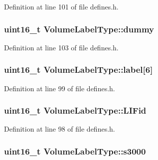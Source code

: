 Definition at line 101 of file defines.\+h.

\subsubsection[{\texorpdfstring{dummy}{dummy}}]{\setlength{\rightskip}{0pt plus 5cm}uint16\+\_\+t Volume\+Label\+Type\+::dummy}\hypertarget{structVolumeLabelType_affbd520c08374524f13708acc05f3f4e}{}\label{structVolumeLabelType_affbd520c08374524f13708acc05f3f4e}


Definition at line 103 of file defines.\+h.

\subsubsection[{\texorpdfstring{label}{label}}]{\setlength{\rightskip}{0pt plus 5cm}uint16\+\_\+t Volume\+Label\+Type\+::label\mbox{[}6\mbox{]}}\hypertarget{structVolumeLabelType_a265fc834b203868cc48482a8be64f60c}{}\label{structVolumeLabelType_a265fc834b203868cc48482a8be64f60c}


Definition at line 99 of file defines.\+h.

\subsubsection[{\texorpdfstring{L\+I\+Fid}{LIFid}}]{\setlength{\rightskip}{0pt plus 5cm}uint16\+\_\+t Volume\+Label\+Type\+::\+L\+I\+Fid}\hypertarget{structVolumeLabelType_a16bdde2d19114ac3238477c29fe75b4a}{}\label{structVolumeLabelType_a16bdde2d19114ac3238477c29fe75b4a}


Definition at line 98 of file defines.\+h.

\subsubsection[{\texorpdfstring{s3000}{s3000}}]{\setlength{\rightskip}{0pt plus 5cm}uint16\+\_\+t Volume\+Label\+Type\+::s3000}\hypertarget{structVolumeLabelType_ac7659e37fbb2bcb0b66c0a0172f9b16c}{}\label{structVolumeLabelType_ac7659e37fbb2bcb0b66c0a0172f9b16c}


